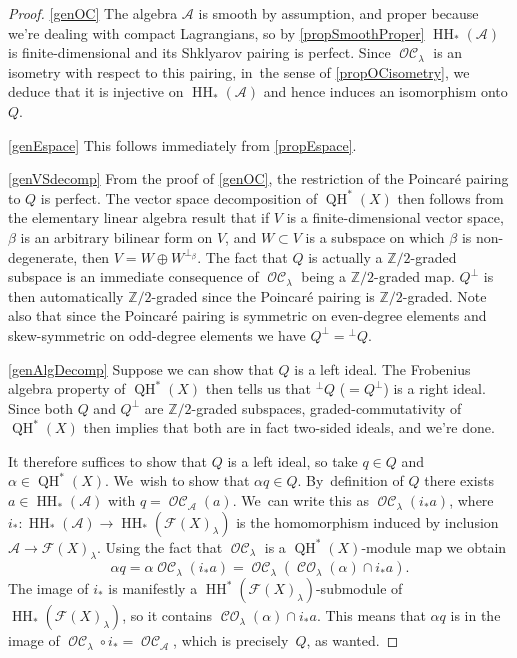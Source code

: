 \documentclass[JEP,XML,SOM,Unicode,NoEqCountersInSection,NoFloatCountersInSection,published]{cedram}
\theoremstyle{definition}
\newcommand{\ZZ}{\mathbb{Z}}
\newcommand{\calA}{\mathcal{A}}
\newcommand{\Fuk}{\mathcal{F}}
\newcommand{\HH}{\operatorname{HH}}
\newcommand{\CO}{\operatorname{\mathcal{CO}}}
\newcommand{\OC}{\operatorname{\mathcal{OC}}}
\newcommand{\QH}{\operatorname{QH}}
\begin{document}
\skpt
\begin{proof}
\eqref{genOC} The algebra $\calA$ is smooth by assumption, and proper because we're dealing with compact Lagrangians, so by \cref{propSmoothProper} $\HH_*(\calA)$ is finite-dimensional and its Shklyarov pairing is perfect. Since $\OC_\lambda$ is an isometry with respect to this pairing, in~the sense of \cref{propOCisometry}, we deduce that it is injective on $\HH_*(\calA)$ and hence induces an isomorphism onto $Q$.

\eqref{genEspace} This follows immediately from \cref{propEspace}.

\eqref{genVSdecomp} From the proof of \eqref{genOC}, the restriction of the Poincaré pairing to $Q$ is perfect. The vector space decomposition of $\QH^*(X)$ then follows from the elementary linear algebra result that if $V$ is a finite-dimensional vector space, $\beta$ is an arbitrary bilinear form on $V$, and $W \subset V$ is a subspace on which $\beta$ is non-degenerate, then $V = W \oplus W^{\perp_\beta}$. The fact that $Q$ is actually a $\ZZ/2$-graded subspace is an immediate consequence of $\OC_\lambda$ being a $\ZZ/2$-graded map. $Q^\perp$ is then automatically $\ZZ/2$-graded since the Poincaré pairing is $\ZZ/2$-graded. Note also that since the Poincaré pairing is symmetric on even-degree elements and skew-symmetric on odd-degree elements we have $Q^\perp = {}^\perp Q$.

\eqref{genAlgDecomp} Suppose we can show that $Q$ is a left ideal. The Frobenius algebra property of $\QH^*(X)$ then tells us that ${}^\perp Q$ ($=Q^\perp$) is a right ideal. Since both $Q$ and $Q^\perp$ are $\ZZ/2$-graded subspaces, graded-commutativity of $\QH^*(X)$ then implies that both are in fact two-sided ideals, and we're done.

It therefore suffices to show that $Q$ is a left ideal, so take $q \in Q$ and $\alpha \in \QH^*(X)$. We~wish to show that $\alpha q \in Q$. By~definition of $Q$ there exists $a \in \HH_*(\calA)$ with $q = \OC_\calA(a)$. We~can write this as $\OC_\lambda(i_*a)$, where $i_* : \HH_*(\calA) \to \HH_*(\Fuk(X)_\lambda)$ is the homomorphism induced by inclusion $\calA \to \Fuk(X)_\lambda$. Using the fact that $\OC_\lambda$ is a $\QH^*(X)$-module map we obtain
\[
\alpha q = \alpha \OC_\lambda(i_*a) = \OC_\lambda(\CO_\lambda(\alpha) \cap i_*a).
\]
The image of $i_*$ is manifestly a $\HH^*(\Fuk(X)_\lambda)$-submodule of $\HH_*(\Fuk(X)_\lambda)$, so it contains $\CO_\lambda(\alpha) \cap i_*a$. This means that $\alpha q$ is in the image of $\OC_\lambda \circ i_* = \OC_\calA$, which is pre\-cisely~$Q$, as wanted.


\end{proof}
\end{document}
